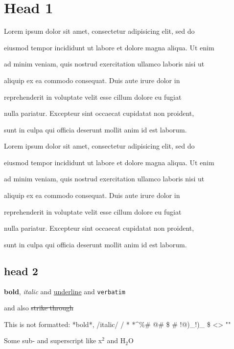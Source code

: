 \chapter{Head 1}

Lorem ipsum dolor sit amet, consectetur adipisicing elit, sed do

eiusmod tempor incididunt ut labore et dolore magna aliqua. Ut enim

ad minim veniam, quis nostrud exercitation ullamco laboris nisi ut

aliquip ex ea commodo consequat. Duis aute irure dolor in

reprehenderit in voluptate velit esse cillum dolore eu fugiat

nulla pariatur.  Excepteur sint occaecat cupidatat non proident,

sunt in culpa qui officia deserunt mollit anim id est laborum.



	Lorem ipsum dolor sit amet, consectetur adipisicing elit, sed do
	
	eiusmod tempor incididunt ut labore et dolore magna aliqua. Ut enim
	
	ad minim veniam, quis nostrud exercitation ullamco laboris nisi ut
	
	aliquip ex ea commodo consequat. Duis aute irure dolor in
	
	reprehenderit in voluptate velit esse cillum dolore eu fugiat
	
	nulla pariatur.  Excepteur sint occaecat cupidatat non proident,
	
	sunt in culpa qui officia deserunt mollit anim id est laborum.
	


\section{head 2}



\textbf{bold}, \emph{italic} and \uline{underline} and \lstinline+verbatim+

and also \sout{strike through}



This is not formatted: *bold*, /italic/ / * *\^{}\%\# @\# \$ \# !@)\_!)\_ \$ \textless{}\textgreater{} ""



Some sub- and superscript like x$^{2}$ and H$_{2}$O



